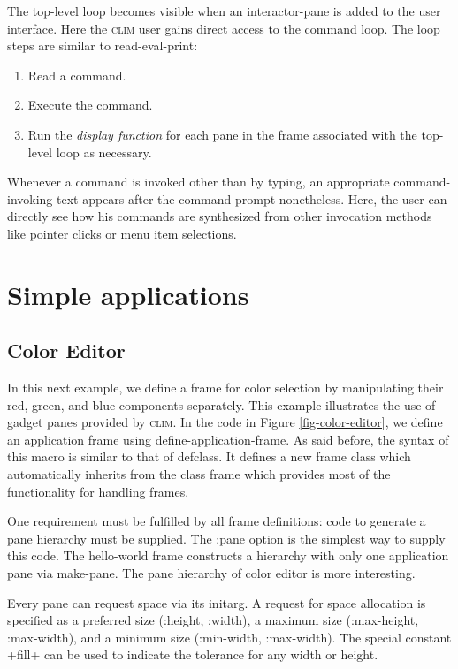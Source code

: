 \documentclass[twocolumn,a4paper]{article}
\newcommand {\concept} [1] {{\sl #1}\index{#1}}
\newcommand {\code}[1]{{\sffamily #1}}
\newcommand {\CLIM}{\textsc{clim}}
\let\class\code
\let\method\code
\let\constant\code
\let\keyword\code
\begin{document}
The top-level loop becomes visible when an interactor-pane is added to
the user interface. Here the \CLIM{} user gains direct access to the
command loop. The loop steps are similar to read-eval-print:

\begin{enumerate}
\item Read a command.
\item Execute the command.
\item Run the \concept{display function} for each pane in the frame
associated with the top-level loop as necessary.
\end{enumerate}

Whenever a command is invoked other than by typing, an appropriate
command-invoking text appears after the command prompt
nonetheless. Here, the user can directly see how his commands are
synthesized from other invocation methods like pointer clicks or menu
item selections.

\section{Simple applications}

\subsection{Color Editor} In this next example, we define a frame for
color selection by manipulating their red, green, and blue components
separately. This example illustrates the use of gadget panes provided
by \CLIM{}. In the code in Figure \ref{fig-color-editor}, we define an
application frame using \method{define-application-frame}. As said
before, the syntax of this macro is similar to that of \class{defclass}. It
defines a new frame class which automatically inherits from the class
\class{frame} which provides most of the functionality for handling
frames.

One requirement must be fulfilled by all frame definitions: code to
generate a pane hierarchy must be supplied. The \keyword{:pane} option
is the simplest way to supply this code.  The \class{hello-world} frame
constructs a hierarchy with only one application pane via
\method{make-pane}. The pane hierarchy of color editor is more
interesting.

Every pane can request space via its initarg. A request for space
allocation is specified as a preferred size (\keyword{:height},
\keyword{:width}), a maximum size (\keyword{:max-height},
\keyword{:max-width}), and a minimum size (\keyword{:min-width},
\keyword{:max-width}). The special constant \constant{+fill+} can be
used to indicate the tolerance for any width or height.
\end{document}
